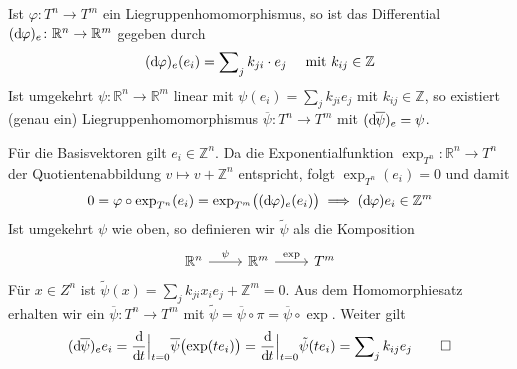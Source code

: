 \begin{lemma}[label=lem:Tn_to_Tm]
	Ist $\varphi \colon T^n \to T^m$ ein Liegruppenhomomorphismus, so ist das Differential $(\mathd \varphi)_e \colon \mathbb{R}^n \to \mathbb{R}^m$ gegeben durch 
	\[
		(\mathd \varphi)_e(e_i) = \sum\nolimits_j k_{ji} \cdot e_j \quad \text{ mit } k_{ij} \in \mathbb{Z} 
	\]
	Ist umgekehrt $\psi \colon \mathbb{R}^n \to \mathbb{R}^m$ linear mit $\psi(e_i)=\sum_j k_{ji} e_j$ mit $k_{ij} \in \mathbb{Z}$, so existiert (genau ein) Liegruppenhomomorphismus $\overline{\psi} \colon T^n \to T^m$ mit $(\mathd \overline{\psi})_e = \psi$.
\end{lemma}
\begin{beweis}
	Für die Basisvektoren gilt $e_i \in \mathbb{Z}^n$.
	Da die Exponentialfunktion $\exp_{T^n} \colon \mathbb{R}^n \to T^n$ der Quotientenabbildung $v \mapsto v + \mathbb{Z}^n$ entspricht, folgt $\exp_{T^n}(e_i)=0$ und damit
	\[
		0 = \varphi \circ \exp_{T^n}(e_i) = \exp_{T^m} \enbrace[\big]{(\mathd \varphi)_e (e_i)} \implies (\mathd \varphi) e_i \in \mathbb{Z}^m
	\]
	Ist umgekehrt $\psi$ wie oben, so definieren wir $\tilde{\psi}$ als die Komposition 
	\[
		\begin{tikzcd}
			\mathbb{R}^n \rar["\psi"] & \mathbb{R}^m \rar["\exp"] & T^m
		\end{tikzcd}
	\]
	Für $x \in Z^n$ ist $\tilde{\psi}(x) = \sum_j k_{ji} x_i e_j + \mathbb{Z}^m = 0$.
	Aus dem Homomorphiesatz erhalten wir ein $\overline{\psi} \colon T^n \to T^m$ mit $\tilde{\psi} = \overline{\psi} \circ \pi = \overline{\psi} \circ {\exp}$.
	Weiter gilt
	\[
		(\mathd \overline{\psi})_e  e_i =\diffd{}{t}\Big|_{t=0} \overline{\psi} \enbrace[\big]{\exp(t e_i)} = \diffd{}{t}\Big|_{t=0} \tilde{\psi}(t e_i) = \sum\nolimits_j k_{ij} e_j \qedhere
	\]
\end{beweis}

